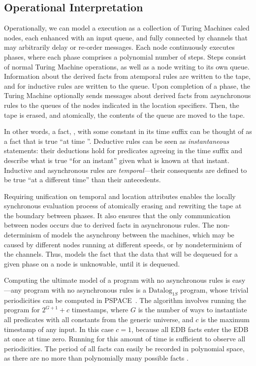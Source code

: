 \subsection{Operational Interpretation}
Operationally, we can model a \lang execution as a collection of Turing Machines caled nodes, each enhanced with an input queue, and fully connected by channels that may arbitrarily delay or re-order messages.  Each node continuously executes phases, where each phase comprises a polynomial number of steps.  Steps consist of normal Turing Machine operations, as well as a node writing to its own queue.  Information about the derived facts from atemporal rules are written to the tape, and for inductive rules are written to the queue.  Upon completion of a phase, the Turing Machine optionally sends messages about derived facts from asynchronous rules to the queues of the nodes indicated in the location specifiers.  Then, the tape is erased, and atomically, the contents of the queue are moved to the tape.

In other words, a fact, , with some constant  in its time suffix can be thought of as a fact that is true ``at time ''.  Deductive rules can be seen as {\em instantaneous} statements: their deductions hold for predicates agreeing in the time suffix and describe what is true ``for an instant'' given what is known at that instant. Inductive and asynchronous rules are {\em temporal}---their consequents are defined to be true ``at a different time'' than their antecedents.

Requiring unification on temporal and location attributes enables the locally synchronous evaluation process of atomically erasing and rewriting the tape at the boundary between phases.  It also ensures that the only communication between nodes occurs due to derived facts in asynchronous rules.  The non-determinism of  models the asynchrony between the machines, which may be caused by different nodes running at different speeds, or by nondeterminism of the channels. Thus,  models the fact that the data that will be dequeued for a given phase on a node is unknowable, until it is dequeued.

Computing the ultimate model of a program with no asynchronous rules is easy---any \lang program with no asynchronous rules is a $\text{Datalog}_{1S}$ program, whose trivial periodicities can be computed in PSPACE~\cite{tdd}.  The algorithm involves 
running the program for $2^{G+1} + c$ timestamps, where $G$ is the number of ways to instantiate all predicates with all constants from the generic universe, and $c$ is the maximum timestamp of any input.  In this case $c = 1$, because all EDB facts enter the EDB at once at time zero.  Running for this amount of time is sufficient to observe all periodicities.  The period of all facts can easily be recorded in polynomial space, as there are no more than polynomially many possible facts .

